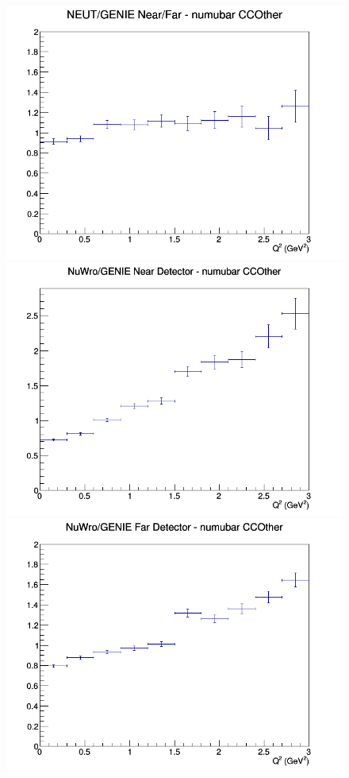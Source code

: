 \documentclass[12pt]{article}
\begin{document}
\begin{figure}[h]
\endminipage
{}
\includegraphics[width=\linewidth]{eff_Q2/GAr/ratios/CCOther_NEUT_GENIE_numubar_NF_Q2.png}
\endminipage
\newline
{}
\includegraphics[width=\linewidth]{eff_Q2/GAr/ratios/CCOther_NuWro_GENIE_numubar_near_Q2.png}
\endminipage
{}
\includegraphics[width=\linewidth]{eff_Q2/GAr/ratios/CCOther_NuWro_GENIE_numubar_far_Q2.png}

\end{figure}
\end{document}
